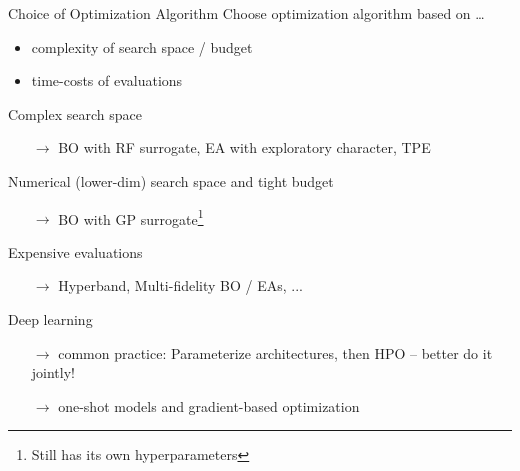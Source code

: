 	  \begin{frame}{Choice of Optimization Algorithm}
		Choose optimization algorithm based on \ldots
		\begin{itemize}
		  \item complexity of search space / budget
		  \item time-costs of evaluations
		\end{itemize}
	  
		\vspace{0.5em}
	  
		Complex search space
		\begin{itemize}
		  \item[$\rightarrow$] BO with RF surrogate, EA with exploratory character, TPE 
		\end{itemize}
		Numerical (lower-dim) search space and tight budget
		\begin{itemize}
		  \item[$\rightarrow$] BO with GP surrogate\footnote{Still has its own hyperparameters }
		\end{itemize}
		Expensive evaluations
		\begin{itemize}
		  \item[$\rightarrow$] Hyperband, Multi-fidelity BO / EAs, ...
		\end{itemize}
		Deep learning 
		\begin{itemize}
		  \item[$\rightarrow$] common practice: Parameterize architectures, then HPO -- better do it jointly!
		  \item[$\rightarrow$] one-shot models and gradient-based optimization
		\end{itemize}
	  
	\end{frame}

